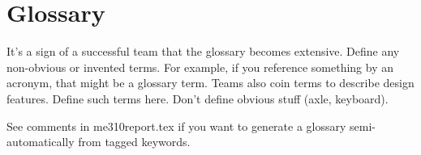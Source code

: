 \documentclass[11pt,letterpaper,oneside]{memoir}
\begin{document}
\section*{Glossary}
\label{sec-glossary}
\begin{description}
\end{description}

\begin{remark}
\color{blue}
It's a sign of a successful team that the glossary becomes extensive. Define any non-obvious or invented terms. For example, if you reference something by an acronym, that might be a glossary term. Teams also coin terms to describe design features. Define such terms here.  Don't define obvious stuff (axle, keyboard).  

See comments in me310report.tex if you want to generate a glossary semi-automatically from tagged keywords.
\normalcolor
\end{remark}


 











%

\appendix
{}
 
\end{document}
